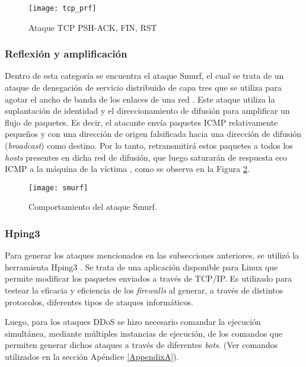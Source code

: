 \begin{figure}[H]
	\centering 
	\texttt{[image: tcp\_prf]}
	\caption{Ataque TCP PSH-ACK, FIN, RST}
	\label{fig:tcp_prf}
\end{figure}


\subsubsection * {Reflexión y amplificación} \label{sec:smurf}

Dentro de esta categoría se encuentra el ataque Smurf, el cual se trata de un
ataque de denegación de servicio distribuido de capa tres que se utiliza para
agotar el ancho de banda de los enlaces de una red \parencite {ddos_amir}. 
Este ataque utiliza la suplantación de identidad y el
direccionamiento de difusión para amplificar un flujo de paquetes. Es decir,
 el atacante
envía paquetes ICMP relativamente pequeños y con una dirección de origen
falsificada hacia una dirección de difusión (\textit{broadcast}) como destino. 
Por lo tanto, retransmitirá estos paquetes a todos los \textit{hosts} presentes 
en dicha red de difusión, que luego 
saturarán de respuesta eco ICMP a la máquina de la víctima \parencite{art_exploit},
 como se observa en la Figura \ref{fig:smurf}.

\begin{figure}[H]
	\centering 
	\texttt{[image: smurf]}
	\caption{Comportamiento del ataque Smurf.}
	\label{fig:smurf}
\end{figure}

\subsubsection * {Hping3}

Para generar los ataques mencionados en las subsecciones anteriores, se utilizó
la herramienta Hping3 \parencite{hping3}\parencite{hping3_man}. Se trata de una aplicación disponible
para Linux que permite modificar los paquetes enviados a través de TCP/IP. Es
utilizado para testear la eficacia y eficiencia de los \textit{firewalls} al
generar, a través de distintos protocolos, diferentes tipos de ataques
informáticos.

Luego, para los ataques DDoS se hizo necesario comandar
la ejecución simultánea, mediante múltiples instancias de ejecución, de los
comandos que permiten generar dichos ataques a través de diferentes \textit{bots}.
(Ver comandos utilizados en la sección Apéndice \ref{AppendixA}).


